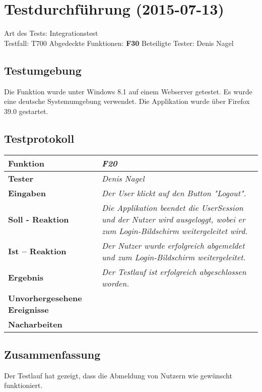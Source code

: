
\chapter{Testdurchführung (2015-07-13)}

Art des Tests: Integrationstest\\
Testfall: T700
Abgedeckte Funktionen: \textbf{F30}
Beteiligte Tester: Denis Nagel\\

\section{Testumgebung}

Die Funktion wurde unter Windows 8.1 auf einem Webserver  getestet. Es wurde eine deutsche Systemumgebung verwendet. Die Applikation wurde über Firefox 39.0 gestartet.

\section{Testprotokoll}

\begin{longtable}{|p{4cm}|p{11cm}|}
\hline
\textbf{Funktion} & \textit{\textbf{F20}} \\
\hline
\textbf{Tester} & \textit{Denis Nagel} \\
\hline
\textbf{Eingaben} & \textit{Der User klickt auf den Button "Logout".} \\
\hline
\textbf{Soll - Reaktion} & \textit{Die Applikation beendet die UserSession und der Nutzer wird ausgeloggt, wobei er zum Login-Bildschirm weitergeleitet wird.} \\
\hline
\textbf{Ist -- Reaktion} & \textit{Der Nutzer wurde erfolgreich abgemeldet und zum Login-Bildschirm weitergeleitet.} \\
\hline
\textbf{Ergebnis} & \textit{Der Testlauf ist erfolgreich abgeschlossen worden.} \\
\hline
\textbf{Unvorhergesehene Ereignisse} &
\textit{} \\
\hline
\textbf{Nacharbeiten } & \textit{} \\
\hline
\end{longtable}

\section{Zusammenfassung}

Der Testlauf hat gezeigt, dass die Abmeldung von Nutzern wie gewünscht funktioniert.
